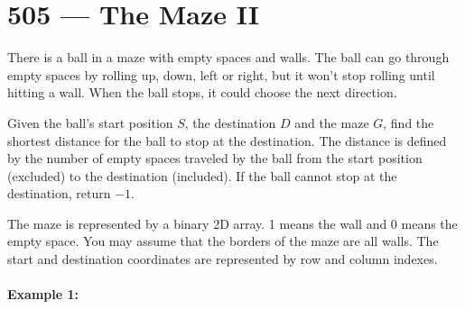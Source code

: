 \section{505 --- The Maze II}
There is a ball in a maze with empty spaces and walls. The ball can go through empty spaces by rolling up, down, left or right, but it won't stop rolling until hitting a wall. When the ball stops, it could choose the next direction.

Given the ball's start position $S$, the destination $D$ and the maze $G$, find the shortest distance for the ball to stop at the destination. The distance is defined by the number of empty spaces traveled by the ball from the start position (excluded) to the destination (included). If the ball cannot stop at the destination, return $-1$.

The maze is represented by a binary 2D array. 1 means the wall and 0 means the empty space. You may assume that the borders of the maze are all walls. The start and destination coordinates are represented by row and column indexes.
 

\paragraph{Example 1:}

